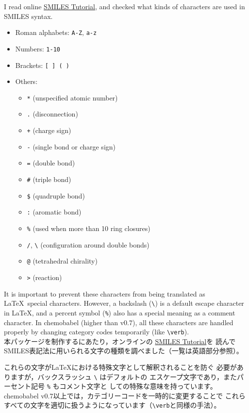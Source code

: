 \documentclass[dvipdfmx,12pt]{jsarticle}
\begin{document}
I read online
\href{http://www.daylight.com/meetings/summerschool98/course/dave/smiles-intro.html}{SMILES Tutorial},
and checked what kinds of characters are used in SMILES syntax.
\begin{itemize}
\item Roman alphabets: \verb|A-Z|, \verb|a-z|
\item Numbers: \verb|1-10|
\item Brackets: \verb|[ ] ( )|
\item Others:
\begin{itemize}
\item \verb|*| (unspecified atomic number)
\item \verb|.| (disconnection)
\item \verb|+| (charge sign)
\item \verb|-| (single bond or charge sign)
\item \verb|=| (double bond)
\item \verb|#| (triple bond)
\item \verb|$| (quadruple bond)
\item \verb|:| (aromatic bond)
\item \verb|%| (used when more than 10 ring closures)
\item \verb|/|, \verb|\| (configuration around double bonds)
\item \verb|@| (tetrahedral chirality)
\item \verb|>| (reaction)
\end{itemize}
\end{itemize}

It is important to prevent these characters from being translated as
\LaTeX\ special characters.
However, a backslash (\verb|\|) is a default escape character in \LaTeX,
and a percent symbol (\verb|%|) also has a special meaning as a comment character.
In \textsf{chemobabel} (higher than v0.7), all these characters are
handled properly by changing category codes temporarily (like \verb+\verb+). \\

本パッケージを制作するにあたり，オンラインの
\href{http://www.daylight.com/meetings/summerschool98/course/dave/smiles-intro.html}{SMILES Tutorial}を
読んでSMILES表記法に用いられる文字の種類を調べました（一覧は英語部分参照）。

これらの文字が\LaTeX における特殊文字として解釈されることを防ぐ
必要がありますが，バックスラッシュ \verb|\| はデフォルトの
エスケープ文字であり，またパーセント記号 \verb|%| もコメント文字と
しての特殊な意味を持っています。
\textsf{chemobabel} v0.7以上では，カテゴリーコードを一時的に変更することで
これらすべての文字を適切に扱うようになっています（\verb+\verb+と同様の手法）。
\end{document}
